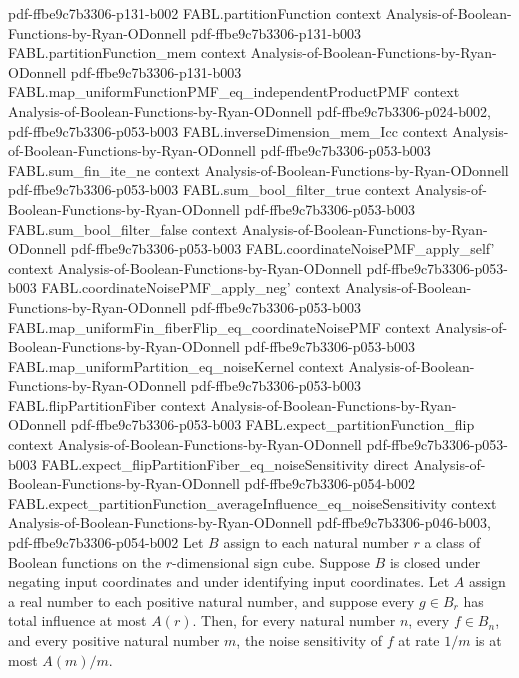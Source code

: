 \begin{theorem}
  {pdf-ffbe9c7b3306-p131-b002}
\proofstep
  {FABL.partitionFunction}
  {context}
  {Analysis-of-Boolean-Functions-by-Ryan-ODonnell}
  {pdf-ffbe9c7b3306-p131-b003}
\proofstep
  {FABL.partitionFunction_mem}
  {context}
  {Analysis-of-Boolean-Functions-by-Ryan-ODonnell}
  {pdf-ffbe9c7b3306-p131-b003}
\proofstep
  {FABL.map_uniformFunctionPMF_eq_independentProductPMF}
  {context}
  {Analysis-of-Boolean-Functions-by-Ryan-ODonnell}
  {pdf-ffbe9c7b3306-p024-b002,
    pdf-ffbe9c7b3306-p053-b003}
\proofstep
  {FABL.inverseDimension_mem_Icc}
  {context}
  {Analysis-of-Boolean-Functions-by-Ryan-ODonnell}
  {pdf-ffbe9c7b3306-p053-b003}
\proofstep
  {FABL.sum_fin_ite_ne}
  {context}
  {Analysis-of-Boolean-Functions-by-Ryan-ODonnell}
  {pdf-ffbe9c7b3306-p053-b003}
\proofstep
  {FABL.sum_bool_filter_true}
  {context}
  {Analysis-of-Boolean-Functions-by-Ryan-ODonnell}
  {pdf-ffbe9c7b3306-p053-b003}
\proofstep
  {FABL.sum_bool_filter_false}
  {context}
  {Analysis-of-Boolean-Functions-by-Ryan-ODonnell}
  {pdf-ffbe9c7b3306-p053-b003}
\proofstep
  {FABL.coordinateNoisePMF_apply_self'}
  {context}
  {Analysis-of-Boolean-Functions-by-Ryan-ODonnell}
  {pdf-ffbe9c7b3306-p053-b003}
\proofstep
  {FABL.coordinateNoisePMF_apply_neg'}
  {context}
  {Analysis-of-Boolean-Functions-by-Ryan-ODonnell}
  {pdf-ffbe9c7b3306-p053-b003}
\proofstep
  {FABL.map_uniformFin_fiberFlip_eq_coordinateNoisePMF}
  {context}
  {Analysis-of-Boolean-Functions-by-Ryan-ODonnell}
  {pdf-ffbe9c7b3306-p053-b003}
\proofstep
  {FABL.map_uniformPartition_eq_noiseKernel}
  {context}
  {Analysis-of-Boolean-Functions-by-Ryan-ODonnell}
  {pdf-ffbe9c7b3306-p053-b003}
\proofstep
  {FABL.flipPartitionFiber}
  {context}
  {Analysis-of-Boolean-Functions-by-Ryan-ODonnell}
  {pdf-ffbe9c7b3306-p053-b003}
\proofstep
  {FABL.expect_partitionFunction_flip}
  {context}
  {Analysis-of-Boolean-Functions-by-Ryan-ODonnell}
  {pdf-ffbe9c7b3306-p053-b003}
\proofstep
  {FABL.expect_flipPartitionFiber_eq_noiseSensitivity}
  {direct}
  {Analysis-of-Boolean-Functions-by-Ryan-ODonnell}
  {pdf-ffbe9c7b3306-p054-b002}
\proofstep
  {FABL.expect_partitionFunction_averageInfluence_eq_noiseSensitivity}
  {context}
  {Analysis-of-Boolean-Functions-by-Ryan-ODonnell}
  {pdf-ffbe9c7b3306-p046-b003,
    pdf-ffbe9c7b3306-p054-b002}
Let $B$ assign to each natural number $r$ a class of Boolean functions on the
$r$-dimensional sign cube. Suppose $B$ is closed under negating input coordinates and
under identifying input coordinates. Let $A$ assign a real number to each positive
natural number, and suppose every $g\in B_r$ has total influence at most $A(r)$. Then,
for every natural number $n$, every $f\in B_n$, and every positive natural number $m$,
the noise sensitivity of $f$ at rate $1/m$ is at most $A(m)/m$.
\end{theorem}

